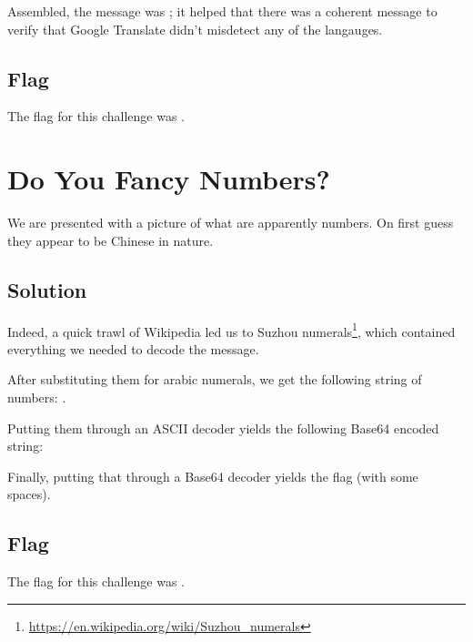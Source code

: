		Assembled, the message was ; it helped that there was a coherent message to verify that
		Google Translate didn't misdetect any of the langauges.


	\subsection{Flag}
		The flag for this challenge was .



\pagebreak
\section{Do You Fancy Numbers?}

	We are presented with a picture of what are apparently numbers. On first guess they appear to be Chinese in nature.

	\subsection{Solution}

		Indeed, a quick trawl of Wikipedia led us to Suzhou numerals\footnote{\url{https://en.wikipedia.org/wiki/Suzhou_numerals}}, which
		contained everything we needed to decode the message.

		After substituting them for arabic numerals, we get the following string of numbers:
		  \ttt{68}           
		             
		        .

		Putting them through an ASCII decoder yields the following Base64 encoded string:

		Finally, putting that through a Base64 decoder yields the flag (with some spaces).


	\subsection{Flag}
		The flag for this challenge was .

